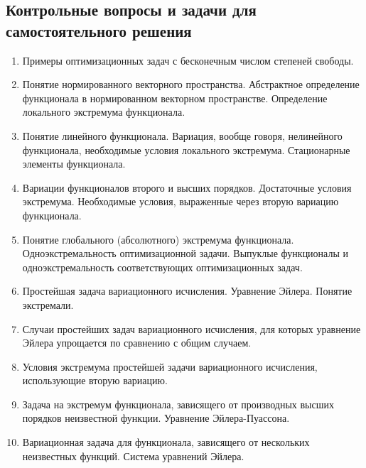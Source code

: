\subsection*{Контрольные вопросы и задачи для самостоятельного решения}

\begin{enumerate}
	\item  	Примеры оптимизационных задач с бесконечным числом степеней свободы.

	\item  	Понятие нормированного векторного пространства. Абстрактное определение функционала в нормированном векторном пространстве. Определение локального экстремума функционала.

	\item 	Понятие линейного функционала. Вариация, вообще говоря, нелинейного функционала, необходимые условия локального экстремума. Стационарные элементы функционала.

	\item  	Вариации функционалов второго и высших порядков. Достаточные условия экстремума. Необходимые условия, выраженные через вторую вариацию функционала.

	\item  	Понятие глобального (абсолютного) экстремума функционала. Одноэкстремальность оптимизационной задачи. Выпуклые функционалы и одноэкстремальность соответствующих оптимизационных задач.

	\item  	Простейшая задача вариационного исчисления. Уравнение Эйлера. Понятие экстремали.

	\item  	Случаи простейших задач вариационного исчисления, для которых уравнение Эйлера упрощается по сравнению с общим случаем.

	\item  	Условия экстремума простейшей задачи вариационного исчисления, использующие вторую вариацию.

	\item  	Задача на экстремум функционала, зависящего от производных высших порядков неизвестной функции. Уравнение Эйлера-Пуассона.


	\item  	Вариационная задача для функционала, зависящего от нескольких неизвестных функций. Система уравнений Эйлера.


\end{enumerate}
